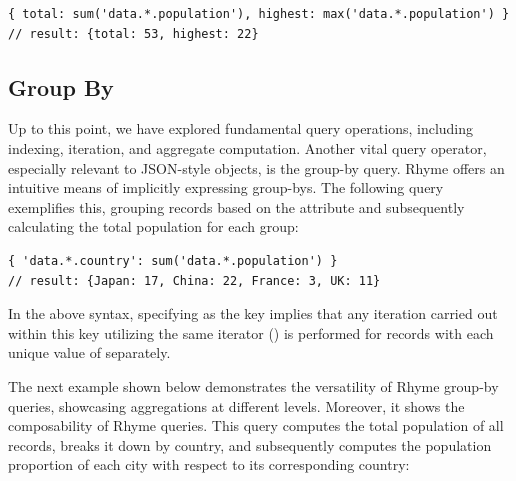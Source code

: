 \documentclass[runningheads]{llncs}
\newcommand{\lang}{Rhyme}
\begin{document}
\begin{lstlisting}[style=JavaScript, columns=flexible, numbers=none]
{ total: sum('data.*.population'), highest: max('data.*.population') }
// result: {total: 53, highest: 22}
\end{lstlisting}




\subsection{Group By}\label{subsec:groupby}
Up to this point, we have explored fundamental query operations, including indexing,
iteration, and aggregate computation.
Another vital query operator, especially relevant to JSON-style objects,
is the group-by query.
\lang{} offers an intuitive means of implicitly expressing group-bys.
The following query exemplifies this, grouping records based on the
 attribute and subsequently calculating the total population
for each group:

\begin{lstlisting}[style=JavaScript, columns=flexible, numbers=none]
{ 'data.*.country': sum('data.*.population') }
// result: {Japan: 17, China: 22, France: 3, UK: 11}
\end{lstlisting}

In the above syntax, specifying  as the key implies
that any iteration carried out within this key utilizing the same
iterator (\inline{*}) is performed for records with each unique value of 
separately.

The next example shown below demonstrates the versatility of \lang{} group-by queries, showcasing
aggregations at different levels.
Moreover, it shows the composability of \lang{} queries.
This query computes the total population of all records, breaks it down by country,
and subsequently computes the population proportion of each city with respect to its
corresponding country:
\end{document}
